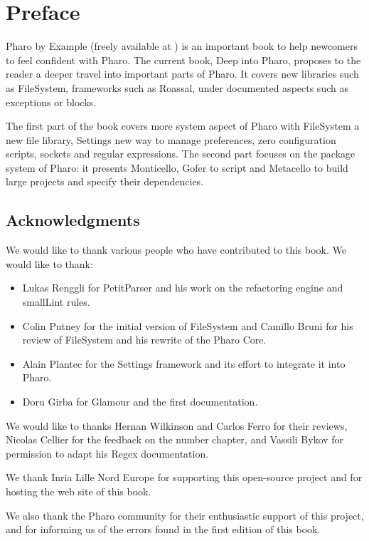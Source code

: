 \documentclass[a4paper,10pt,twoside]{book}
\begin{document}
	\sloppy
	\frontmatter
\fi
\chapter{Preface}

Pharo by Example (freely available at ) is an important book to help newcomers to feel confident with Pharo. 
The current book, Deep into Pharo, proposes to the reader a deeper travel into important parts of Pharo. It covers new libraries such as FileSystem, frameworks such as Roassal, under documented aspects such as exceptions or blocks. 

The first part of the book covers more system aspect of Pharo with FileSystem a new file library, Settings new way to manage preferences, zero configuration scripts, sockets and regular expressions. The second part focuses on the package system of Pharo: it presents Monticello, Gofer to script and Metacello to build large projects and specify their dependencies. 

\section*{Acknowledgments}

We would like to thank various people who have contributed to this book. We would like to thank:
\begin{itemize}
\item Lukas Renggli for PetitParser and his work on the refactoring engine and smallLint rules. 
\item Colin Putney for the initial version of FileSystem and Camillo Bruni for his review of FileSystem and his rewrite of the Pharo Core.
\item Alain Plantec for the Settings framework and its effort to integrate it into Pharo. 
\item Doru Girba for Glamour and the first documentation.
\end{itemize}

We would like to thanks Hernan Wilkinson and Carlos Ferro for their reviews, Nicolas Cellier for the feedback on the number chapter, and Vassili Bykov for permission to adapt his Regex documentation.

We thank Inria Lille Nord Europe for supporting this open-source project and for hosting the web site of this book.

We also thank the Pharo community for their enthusiastic support of this project, and for informing us of the errors found in the first edition of this book.



\ifx\wholebook\relax\else
   
   
\end{document}
